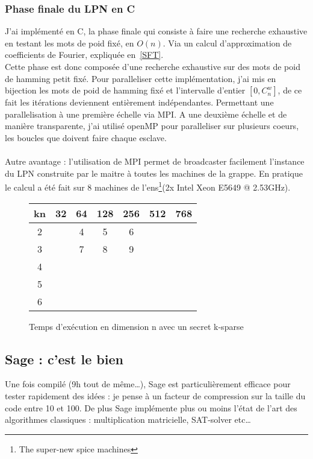 \documentclass{article}		%
\theoremstyle{definition}
\theoremstyle{plain}
\begin{document}
\subsubsection{Phase finale du LPN en C}
J'ai implémenté en C, la phase finale qui consiste à faire une recherche
exhaustive en testant les mots de poid fixé, en $O(n)$. Via un calcul
d'approximation de coefficients de Fourier, expliquée en~\ref{SFT}.
\\
Cette phase est donc composée d'une recherche exhaustive sur des mots de
poid de hamming petit fixé. Pour paralleliser cette implémentation, j'ai
mis en bijection les mots de poid de hamming fixé et l'intervalle
d'entier $[0, C_{n}^{w}]$, de ce fait les itérations deviennent
entièrement indépendantes. Permettant une parallelisation à une première
échelle via MPI.
A une deuxième échelle et de manière transparente, j'ai utilisé openMP
pour paralleliser sur plusieurs coeurs, les boucles que doivent faire
chaque esclave. 
\\\\
Autre avantage : l'utilisation de MPI permet de broadcaster facilement
l'instance du LPN construite par le maitre à toutes les machines de la
grappe. En pratique le calcul a été fait sur 8 machines de
l'ens\footnote{The super-new spice machines}(2x Intel Xeon E5649 @
2.53GHz).  
\begin{figure}
\caption{Temps d'exécution en dimension n avec un secret k-sparse}
\begin{center}
\begin{tabular}{|c |c | c | c | c |c|c| }
\hline
   kn & 32 & 64 & 128 & 256 & 512 & 768 \\
\hline
 2  & &4 & 5 & 6 & &\\
\hline
  3 & &7 & 8 & 9 & &\\
\hline
 4 & & & & & & \\
 \hline
5 & & & & & & \\
 \hline
6 & & & & & & \\
\hline 
\end{tabular}
\end{center}
\end{figure}


\subsection{Sage : c'est le bien}
Une fois compilé (9h tout de même\dots), Sage est particulièrement efficace
pour tester rapidement des idées : je pense à un facteur de compression
sur la taille du code
entre 10 et 100. De plus Sage
implémente plus ou moins l'état de l'art des algorithmes classiques : multiplication
matricielle, SAT-solver etc\dots  
\end{document}
